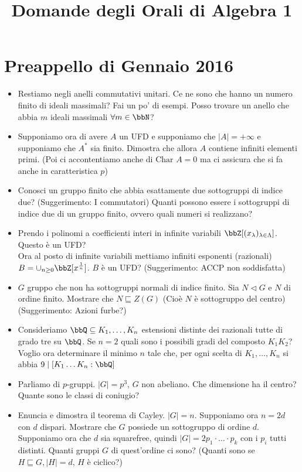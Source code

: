 \documentclass[a4paper,11pt,NoNotes,GeneralMath]{stdmdoc}
\newcommand{\Char}{\text{Char }}
\newcommand{\sgr}{\sqsubseteq}
\newcommand{\nrm}{\lhd}
\begin{document}
	\title{Domande degli Orali di Algebra 1}
	\autodate

    \section*{Preappello di Gennaio 2016}
    \begin{itemize}
        \item Restiamo negli anelli commutativi unitari. Ce ne sono che hanno un numero finito di ideali massimali? Fai un po' di esempi. Posso trovare un anello che abbia $m$ ideali massimali $\forall m \in \bbN$?
        \item Supponiamo ora di avere $A$ un UFD e supponiamo che $\mid A \mid = + \infty$ e supponiamo che $A^{*}$ sia finito. Dimostra che allora $A$ contiene infiniti elementi primi. (Poi ci accontentiamo anche di $\Char A = 0$ ma ci assicura che si fa anche in caratteristica $p$)
        \item Conosci un gruppo finito che abbia esattamente due sottogruppi di indice due? (Suggerimento: I commutatori) Quanti possono essere i sottogruppi di indice due di un gruppo finito, ovvero quali numeri si realizzano?
        \item Prendo i polinomi a coefficienti interi in infinite variabili $\bbZ [(x_\lambda)_{\lambda \in \Lambda}]$. Questo è un UFD? \\
        Ora al posto di infinite variabili mettiamo infiniti esponenti (razionali) $B = \cup_{n \ge 0} \bbZ [ x^{\frac{1}{n}} ]$. $B$ è un UFD? (Suggerimento: ACCP non soddisfatta)
        \item $G$ gruppo che non ha sottogruppi normali di indice finito. Sia $N \nrm G$ e $N$ di ordine finito. Mostrare che $N \sgr Z(G)$ (Cioè $N$ è sottogruppo del centro) (Suggerimento: Azioni furbe?)
        \item Consideriamo $\bbQ \subseteq K_1, \ldots, K_n$ estensioni distinte dei razionali tutte di grado tre su $\bbQ$. Se $n = 2$ quali sono i possibili gradi del composto $K_1K_2$? Voglio ora determinare il minimo $n$ tale che, per ogni scelta di $K_1, \ldots, K_n$ si abbia $9 \mid [K_1 \ldots K_n : \bbQ ]$
        \item Parliamo di $p$-gruppi. $\mid G \mid = p^3$, $G$ non abeliano. Che dimensione ha il centro? Quante sono le classi di coniugio?
        \item Enuncia e dimostra il teorema di Cayley. $\mid G \mid = n$. Supponiamo ora $n = 2d$ con $d$ dispari. Mostrare che $G$ possiede un sottogruppo di ordine $d$. Supponiamo ora che $d$ sia squarefree, quindi $\mid G \mid = 2 p_1 \cdot \ldots \cdot p_k$ con i $p_i$ tutti distinti. Quanti gruppi $G$ di quest'ordine ci sono? (Quanti sono se $H \sgr G, \mid H \mid = d$, $H$ è ciclico?)

\end{itemize}
\end{document}
